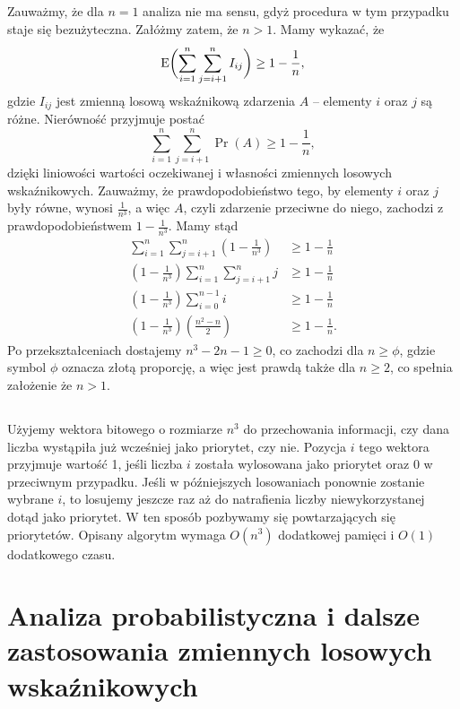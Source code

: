 \subsection{} %
Zauważmy, że dla $n=1$ analiza nie ma sensu, gdyż procedura  w tym przypadku staje się bezużyteczna. Załóżmy zatem, że $n>1$. Mamy wykazać, że
\[
	\operatorname{E}\biggl(\sum_{i=1}^n\sum_{j=i+1}^nI_{ij}\biggr) \ge 1-\frac{1}{n},
\]
gdzie $I_{ij}$ jest zmienną losową wskaźnikową zdarzenia $A$ -- elementy $i$ oraz $j$ są różne. Nierówność przyjmuje postać
\[
	\sum_{i=1}^n\sum_{j=i+1}^n\Pr(A) \ge 1-\frac{1}{n},
\]
dzięki liniowości wartości oczekiwanej i własności zmiennych losowych wskaźnikowych. Zauważmy, że prawdopodobieństwo tego, by elementy $i$ oraz $j$ były równe, wynosi $\frac{1}{n^3}$, a więc $A$, czyli zdarzenie przeciwne do niego, zachodzi z prawdopodobieństwem $1-\frac{1}{n^3}$. Mamy stąd
\begin{align*}
	\sum_{i=1}^n\sum_{j=i+1}^n\left(1-\frac{1}{n^3}\right) &\ge 1-\frac{1}{n} \\
	\left(1-\frac{1}{n^3}\right)\sum_{i=1}^n\sum_{j=i+1}^nj &\ge 1-\frac{1}{n} \\
	\left(1-\frac{1}{n^3}\right)\sum_{i=0}^{n-1}i &\ge 1-\frac{1}{n} \\
	\left(1-\frac{1}{n^3}\right)\left(\frac{n^2-n}{2}\right) &\ge 1-\frac{1}{n}.
\end{align*}
Po przekształceniach dostajemy $n^3-2n-1\ge0$, co zachodzi dla $n\ge\phi$, gdzie symbol $\phi$ oznacza złotą proporcję, a więc jest prawdą także dla $n\ge2$, co spełnia założenie że $n>1$.

\subsection{} %
Użyjemy wektora bitowego o rozmiarze $n^3$ do przechowania informacji, czy dana liczba wystąpiła już wcześniej jako priorytet, czy nie. Pozycja $i$ tego wektora przyjmuje wartość 1, jeśli liczba $i$ została wylosowana jako priorytet oraz 0 w przeciwnym przypadku. Jeśli w późniejszych losowaniach ponownie zostanie wybrane $i$, to losujemy jeszcze raz aż do natrafienia liczby niewykorzystanej dotąd jako priorytet. W ten sposób pozbywamy się powtarzających się priorytetów. Opisany algorytm wymaga $O(n^3)$ dodatkowej pamięci i $O(1)$ dodatkowego czasu.

\section{Analiza probabilistyczna i dalsze zastosowania zmiennych losowych wskaźnikowych}

